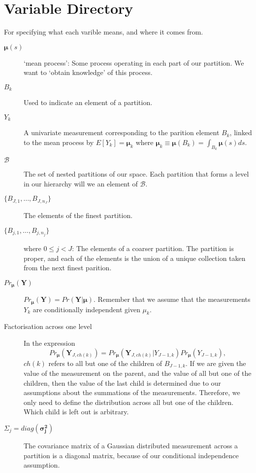 \documentclass[a4paper,12pt]{article}
\theoremstyle{definition}
\begin{document}
\section{Variable Directory}
For specifying what each varible means, and where it comes from.

\begin{description}
  \item[$\boldsymbol{\mu}(s)$] `mean process': Some process operating in each part of our partition. We want to `obtain knowledge' of this process.
  \item[$B_k$] Used to indicate an element of a partition.
  \item[$Y_k$] A univariate measurement corresponding to the parition element $B_k$, linked to the mean process by $E[Y_k] = \boldsymbol{\mu}_k$ where $\boldsymbol{\mu}_k \equiv \boldsymbol{\mu}(B_k) = \int_{B_k}\boldsymbol{\mu}(s)ds$.
	\item[$\mathscr{B}$] The set of nested partitions of our space. Each partition that forms a level in our hierarchy will we an element of $\mathscr{B}$.
  \item[$\lbrace B_{J,1}, \dots, B_{J,n_J} \rbrace$] The elements of the finest partition.
  \item[$\lbrace B_{j,1}, \dots, B_{j,n_j} \rbrace$] where $0 \leq j < J$: The elements of a coarser partition. The partition is proper, and each of the elements is the union of a unique collection taken from the next finest parition.
  \item[$Pr_{\boldsymbol{\mu}}(\mathbf{Y})$] $Pr_{\boldsymbol{\mu}}(\mathbf{Y}) = Pr(\mathbf{Y} | \boldsymbol{\mu})$. Remember that we assume that the measurements $Y_k$ are conditionally independent given $\mu_k$.
  \item[Factorisation across one level] In the expression
  \begin{equation}
  Pr_{\boldsymbol{\mu}}(\mathbf{Y}_{J,ch(k)}) = Pr_{\boldsymbol{\mu}}(\mathbf{Y}_{J,ch(k)} | Y_{J-1, k})Pr_{\boldsymbol{\mu}}(Y_{J-1,k}),
  \end{equation}
  $ch(k)$ refers to all but one of the children of $B_{J-1,k}$. If we are given the value of the measurement on the parent, and the value of all but one of the children, then the value of the last child is determined due to our assumptions about the summations of the measurements. Therefore, we only need to define the distribution across all but one of the children. Which child is left out is arbitrary.
  \item[$\Sigma_j = diag(\boldsymbol{\sigma^2_j})$] The covariance matrix of a Gaussian distributed measurement across a partition is a diagonal matrix, because of our conditional independence assumption.

\end{description}
\end{document}
